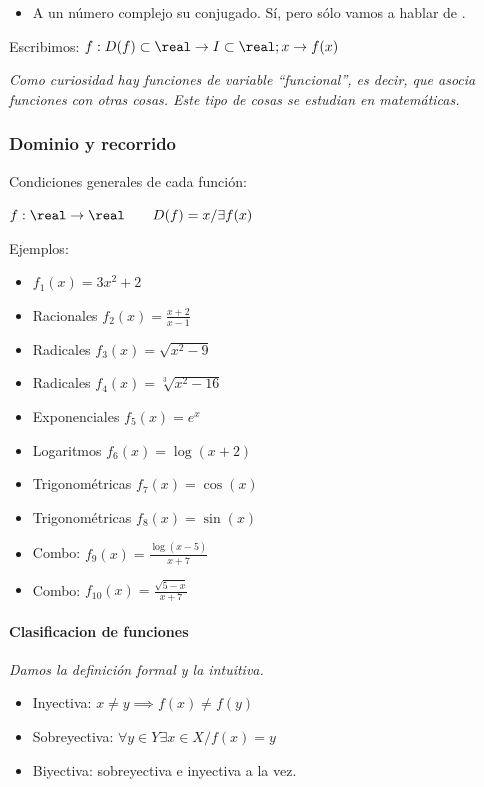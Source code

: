 \documentclass[palatino,nosec]{Docencia}
\begin{document}
\begin{itemize}
	\item A un número complejo su conjugado.
	\subitem Sí, pero sólo vamos a hablar de . 
\end{itemize}

Escribimos:  $f: D(f)\subset\real \to I\subset\real; x\to f(x)$

\textit{Como curiosidad hay funciones de variable ``funcional'', es decir, que asocia funciones con otras cosas. Este tipo de cosas se estudian en matemáticas.}


\subsubsection{Dominio y recorrido} Condiciones generales de cada función:

$f:\real\to\real\quad\quad D(f) = {x / \exists f(x)}$

Ejemplos:
\begin{itemize}
	\item $f_1(x) = 3x^2+2$
	\item Racionales $f_2(x) = \frac{x+2}{x-1}$
	\item Radicales $f_3(x) = \sqrt{x^2-9}$
	\item Radicales $f_4(x) = \sqrt[3]{x^2-16}$
	\item Exponenciales $f_5(x) = e^x$
	\item Logaritmos $f_6(x) = \log(x+2)$
	\item Trigonométricas $f_7(x) = \cos(x)$
	\item Trigonométricas $f_8(x) = \sin(x)$
	\item Combo: $f_9(x) = \frac{\log(x-5)}{x+7}$
	\item Combo: $f_{10}(x) = \frac{\sqrt{5-x}}{x+7}$
\end{itemize}


\paragraph{Clasificacion de funciones} \textit{Damos la definición formal y la intuitiva.}

\begin{itemize}
	\item Inyectiva: $x\neq y \implies f(x) \neq f(y)  $
	\item Sobreyectiva: $\forall y\in Y \exists x\in X / f(x) = y$
	\item Biyectiva: sobreyectiva e inyectiva a la vez.
\end{itemize}
\end{document}
